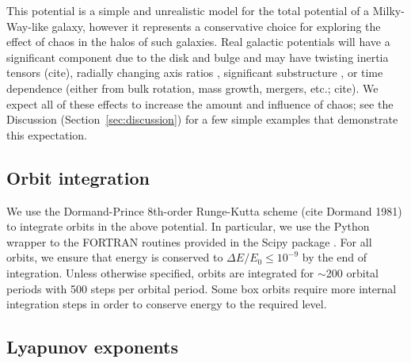 \documentclass[letterpaper,12pt,preprint]{aastex}
\begin{document}
This potential is a simple and unrealistic model for the total potential of a Milky-Way-like galaxy, however it represents a conservative choice for exploring the effect of chaos in the halos of such galaxies. Real galactic potentials will have a significant component due to the disk and bulge and may have twisting inertia tensors (cite), radially changing axis ratios \citep[e.g.,][]{veraciro11}, significant substructure \citep{zemp09}, or time dependence (either from bulk rotation, mass growth, mergers, etc.; cite). We expect all of these effects to increase the amount and influence of chaos; see the Discussion (Section~\ref{sec:discussion}) for a few simple examples that demonstrate this expectation.

\subsection{Orbit integration}

We use the Dormand-Prince 8th-order Runge-Kutta scheme (cite Dormand 1981) to integrate orbits in the above potential. In particular, we use the Python wrapper to the FORTRAN routines provided in the Scipy package \citep{scipy}. For all orbits, we ensure that energy is conserved to $\Delta E/E_0 \leq 10^{-9}$ by the end of integration. Unless otherwise specified, orbits are integrated for $\sim$200 orbital periods with 500 steps per orbital period. Some box orbits require more internal integration steps in order to conserve energy to the required level. 

\subsection{Lyapunov exponents}
\end{document}
